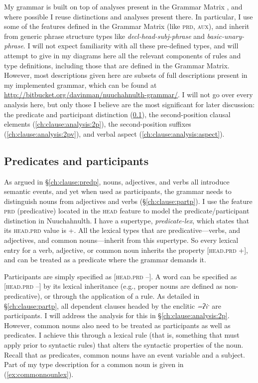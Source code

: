 My grammar is built on top of analyses present in the Grammar Matrix \citep{bender2002}, and where possible I reuse distinctions and analyses present there. In particular, I use some of the features defined in the Grammar Matrix (like \textsc{prd}, \textsc{aux}), and inherit from generic phrase structure types like \textit{decl-head-subj-phrase} and \textit{basic-unary-phrase}. I will not expect familiarity with all these pre-defined types, and will attempt to give in my diagrams here all the relevant components of rules and type definitions, including those that are defined in the Grammar Matrix. However, most descriptions given here are subsets of full descriptions present in my implemented grammar, which can be found at \url{http://bitbucket.org/davinman/nuuchahnulth-grammar/}. I will not go over every analysis here, but only those I believe are the most significant for later discussion: the predicate and participant distinction (\ref{ch:clause:analysis:predpart}), the second-position clausal elements (\ref{ch:clause:analysis:2p}), the second-position suffixes (\ref{ch:clause:analysis:2pv}), and verbal aspect (\ref{ch:clause:analysis:aspect}).

\subsection{Predicates and participants} \label{ch:clause:analysis:predpart}

As argued in \S\ref{ch:clause:predp}, nouns, adjectives, and verbs all introduce semantic events, and yet when used as participants, the grammar needs to distinguish nouns from adjectives and verbs (\S\ref{ch:clause:partp}). I use the feature \textsc{prd} (predicative) located in the \textsc{head} feature to model the predicate/participant distinction in Nuuchahnulth. I have a supertype, \textit{predicate-lex}, which states that its \textsc{head.prd} value is +. All the lexical types that are predicative---verbs, and adjectives, and common nouns---inherit from this supertype. So every lexical entry for a verb, adjective, or common noun inherits the property [\textsc{head.prd} +], and can be treated as a predicate where the grammar demands it.

Participants are simply specified as [\textsc{head.prd} --]. A word can be specified as [\textsc{head.prd} --] by its lexical inheritance (e.g., proper nouns are defined as non-predicative), or through the application of a rule. As detailed in \S\ref{ch:clause:partp}, all dependent clauses headed by the enclitic \textit{=ʔiˑ} are participants. I will address the analysis for this in \S\ref{ch:clause:analysis:2p}. However, common nouns also need to be treated as participants as well as predicates. I achieve this through a lexical rule (that is, something that must apply prior to syntactic rules) that alters the syntactic properties of the noun. Recall that as predicates, common nouns have an event variable and a subject. Part of my type description for a common noun is given in (\ref{ex:commonnounlex}).

